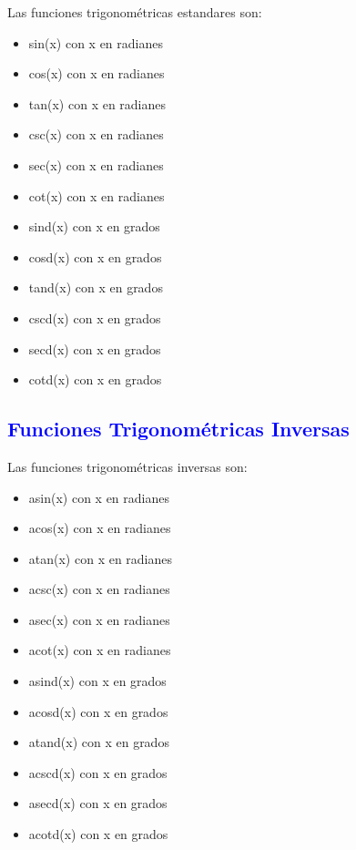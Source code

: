 \documentclass{article}
\begin{document}
	Las funciones trigonométricas estandares son:
	\begin{multicols}{2}
	\begin{itemize}
		\item sin(x) con x en radianes
		\item cos(x) con x en radianes
		\item tan(x) con x en radianes
		\item csc(x) con x en radianes
		\item sec(x) con x en radianes
		\item cot(x) con x en radianes
		\item sind(x) con x en grados
		\item cosd(x) con x en grados
		\item tand(x) con x en grados
		\item cscd(x) con x en grados
		\item secd(x) con x en grados
		\item cotd(x) con x en grados
	\end{itemize}
	\end{multicols}

	\subsection{\textcolor{blue}{Funciones Trigonométricas Inversas}}

		Las funciones trigonométricas inversas son:
	\begin{multicols}{2}
		\begin{itemize}
			\item asin(x) con x en radianes
			\item acos(x) con x en radianes
			\item atan(x) con x en radianes
			\item acsc(x) con x en radianes
			\item asec(x) con x en radianes
			\item acot(x) con x en radianes
			\item asind(x) con x en grados
			\item acosd(x) con x en grados
			\item atand(x) con x en grados
			\item acscd(x) con x en grados
			\item asecd(x) con x en grados
			\item acotd(x) con x en grados
		\end{itemize}
	\end{multicols}
\end{document}
